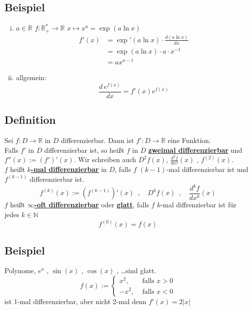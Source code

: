 \subsection{Beispiel} %
\label{sub:beispiel}
\begin{enumerate}[(i)]
	\item $a \in \mathds{R}$ $f: \mathds{R}_+^* \to \mathds{R}$ $x \mapsto x^a = \exp (a \ln x)$
	\begin{align*}
		f'(x) &= \exp' (a \ln x) \cdot \frac{d(a \ln x)}{dx} \\
		&= \exp (a \ln x) \cdot a \cdot x ^{-1} \\
		&= a x^{a-1} 
	\end{align*}
	\item allgemein:
	\[
		\frac{d \, e^{f(x)}}{dx} = f'(x) e^{f(x)} 
	\]
\end{enumerate}

\subsection{Definition} %
\label{sub:definition}
Sei $f : D \to \mathds{R}$ in $D$ differenzierbar. Dann ist $f' : D \to \mathds{R}$ eine Funktion. \\
Falls $f'$ in $D$ differenzierbar ist, so heißt $f$ in $D$ \underline{\textbf{zweimal differenzierbar}} und $f''(x) := (f')'(x)$. Wir schreiben auch $D^2 f(x)$, 
$\frac{d^2 f}{dx^2}(x) $ , $f^{(2)}(x)$.
\vspace{10pt} \\
$f$ heißt \underline{\textbf{$k$-mal differenzierbar}} in $D$, falls $f$ $(k-1)$-mal differenzierbar ist und $f^{(k-1)}$ differenzierbar ist. 
\[
	f^{(k)} (x) := \left( f^{(k-1)}\right)' (x) \enspace , \quad D^k f(x) \enspace , \quad \frac{d^k f}{d x^k} (x) 
\]
$f$ heißt \underline{\textbf{$\infty$-oft differenzierbar}} oder \underline{\textbf{glatt}}, falls $f$ $k$-mal diffrenzierbar ist für jedes $k \in \mathds{N}$
\[
	f^{(0)} (x) = f(x)
\]

\subsection{Beispiel} %
\label{sub:beispiel}
Polynome, $e^x$ , $\sin (x)$ , $\cos (x)$ , \ldots  sind glatt. 
\vspace{10pt} \\
\[
	f(x) := \begin{cases}
			x^2, &\text{ falls }x >0\\
			- x^2 , &\text{ falls } x < 0
		\end{cases}
\] 
ist 1-mal differenzierbar, aber nicht 2-mal denn $f'(x)= 2 |x|$

